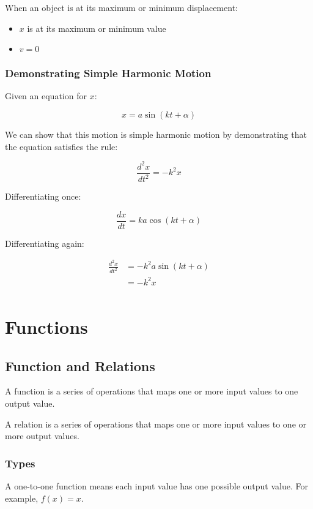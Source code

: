 \documentclass[a4paper,11pt]{report}
\begin{document}
When an object is at its maximum or minimum displacement:

\begin{itemize}
\item $x$ is at its maximum or minimum value
\item $v = 0$
\end{itemize}

\subsection{Demonstrating Simple Harmonic Motion}

Given an equation for $x$:

$$
x = a \sin(kt + \alpha)
$$

We can show that this motion is simple harmonic motion by demonstrating that
the equation satisfies the rule:

$$
\frac{d^2x}{dt^2} = -k^2 x
$$

Differentiating once:

$$
\frac{dx}{dt} = ka \cos(kt + \alpha)
$$

Differentiating again:

$$
\begin{aligned}
\frac{d^2x}{dt^2} & = -k^2 a \sin(kt + \alpha) \\
& = -k^2 x \\
\end{aligned}
$$




\chapter{Functions}

\section{Function and Relations}

A function is a series of operations that maps one or more input values to one
output value.

A relation is a series of operations that maps one or more input values to one
or more output values.

\subsection{Types}

A one-to-one function means each input value has one possible output value.
For example, $f(x) = x$.
\end{document}
